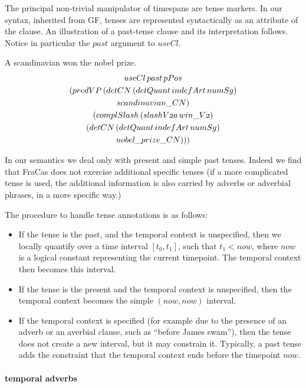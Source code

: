 \documentclass[a4paper,11pt]{article}
\newcommand\onelingex[1]{\begin{lingex}\item #1 \end{lingex}}
\newcommand\jp[1]{\todo[backgroundcolor=blue!10]{JP: #1}}
\begin{document}
\newcommand\varid[1]{\mathnormal{#1}}
%
The principal non-trivial manipulator of timespans are tense
markers. In our syntax, inherited from GF, tenses are represented
syntactically as an attribute of the clause. An illustration of a
past-tense clause and its interpretation follows. Notice in particular
the $past$ argument to $useCl$.

\onelingex{A scandinavian won the nobel prize.\label{ex:onelingex}
\\
{\small\begin{multline*}
\varid{useCl}\, \varid{past}\, \varid{pPos}\\ (\varid{predVP}\, (\varid{detCN}\, (\varid{detQuant}\, \varid{indefArt}\, \varid{numSg})\\ \varid{scandinavian\_CN})\\ (\varid{complSlash}\, (\varid{slashV2a}\, \varid{win\_V2})\\ (\varid{detCN}\, (\varid{detQuant}\, \varid{indefArt}\, \varid{numSg})\\ \varid{nobel\_prize\_CN})))
\end{multline*}
}}
In our semantics we deal only with present and simple past
tenses. \jp{Is this enough for theory?} Indeed we find that FraCas
does not exercise additional specific tenses (if a more complicated
tense is used, the additional information is also carried by adverbs
or adverbial phrases, in a more specific way.)

The procedure to handle tense annotations is as follows:
\begin{itemize}
\item If the tense is the past, and the temporal context is
  unspecified, then we locally quantify over a time interval
  $[t_0,t_1]$, such that $t_1 < now$, where $now$ is a logical
  constant representing the current timepoint. The temporal context
  then becomes this interval.
\item If the tense is the present and the temporal context is
  unspecified, then the temporal context becomes the simple
  $(now,now)$ interval.
\item If the temporal context is specified (for example due to the presence of an adverb or an
  averbial clause, such as ``before James swam''), then the tense does
  not create a new interval, but it may constrain it. Typically, a
  past tense adds the constraint that the temporal context ends before
  the timepoint $now$.
\end{itemize}

\paragraph{temporal adverbs}
\end{document}
